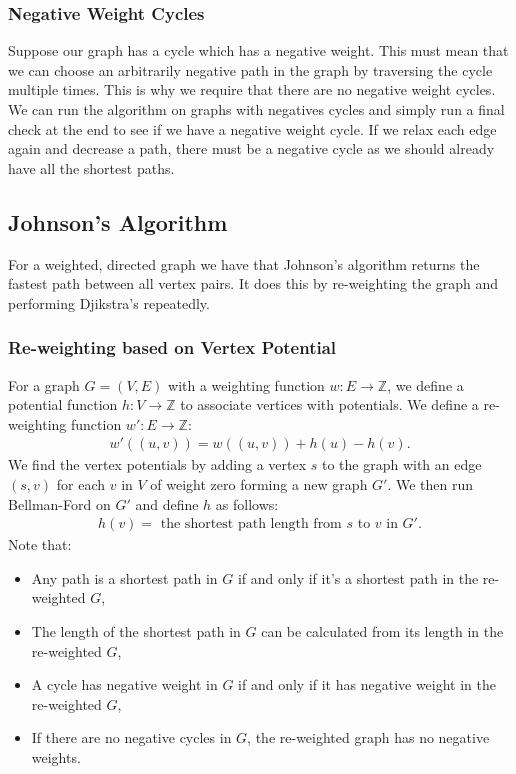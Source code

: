 \subsubsection{Negative Weight Cycles}

Suppose our graph has a cycle which has a negative weight. 
This must mean that we can choose an arbitrarily negative 
path in the graph by traversing the cycle multiple times.
This is why we require that there are no negative weight cycles.
\\[\baselineskip]
We can run the algorithm on graphs with negatives cycles and
simply run a final check at the end to see if we have a negative weight cycle.
If we relax each edge again and decrease a path, there must be a negative cycle
as we should already have all the shortest paths.

\newpage

\subsection{Johnson's Algorithm}

For a weighted, directed graph we have that Johnson's algorithm 
returns the fastest path between all vertex pairs. It does this 
by re-weighting the graph and performing Djikstra's
repeatedly.

\subsubsection{Re-weighting based on Vertex Potential}

For a graph $G = (V, E)$ with a weighting function $w : E \to \mathbb{Z}$, 
we define a potential function $h : V \to \mathbb{Z}$ to associate vertices with 
potentials. We define a re-weighting function $w' : E \to \mathbb{Z}$: \begin{gather*}
  w'((u, v)) = w((u, v)) + h(u) - h(v).
\end{gather*} We find the vertex potentials by adding a vertex $s$ to the graph with
an edge $(s, v)$ for each $v$ in $V$ of weight zero forming a new graph $G'$. 
We then run Bellman-Ford on $G'$ and define $h$ as follows: \begin{gather*}
  h(v) = \text{ the shortest path length from $s$ to $v$ in } G'.
\end{gather*} Note that: \begin{itemize}
  \item Any path is a shortest path in $G$ if and only if it's a shortest path
  in the re-weighted $G$,
  \item The length of the shortest path in $G$ can be calculated from its
  length in the re-weighted $G$,
  \item A cycle has negative weight in $G$ if and only if it has negative
  weight in the re-weighted $G$,
  \item If there are no negative cycles in $G$, the re-weighted graph
  has no negative weights.
\end{itemize}

